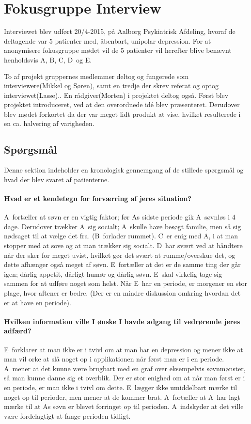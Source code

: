 \newcommand{\pa}{A}
\newcommand{\pb}{B}
\newcommand{\pc}{C}
\newcommand{\pd}{D}
\newcommand{\pe}{E}

\section{Fokusgruppe Interview}
Interviewet blev udført 20/4-2015, på Aalborg Psykiatrisk Afdeling, hvoraf de deltagende var 5 patienter med, åbenbart, unipolar depression.
For at anonymisere fokusgruppe mødet vil de 5 patienter vil herefter blive benævnt henholdsvis \pa, \pb, \pc, \pd~og \pe.

To af projekt gruppernes medlemmer deltog og fungerede som interviewere(Mikkel og Søren), samt en tredje der skrev referat og optog interviewet(Lasse).. En rådgiver(Morten) i projektet deltog også.
Først blev projektet introduceret, ved at den overordnede idé blev præsenteret.
Derudover blev mødet forkortet da der var meget lidt produkt at vise, hvilket resulterede i en ca. halvering af varigheden.

\subsection{Spørgsmål}
Denne sektion indeholder en kronologisk gennemgang af de stillede spørgsmål og hvad der blev svaret af patienterne.

\paragraph{Hvad er et kendetegn for forværring af jeres situation?}
\pa~fortæller at søvn er en vigtig faktor; før \pa s sidste periode gik \pa~søvnløs i 4 dage.
Derudover trækker \pa~sig socialt; \pa~skulle have besøgt familie, men så sig nødsaget til at vælge det fra.
(\pb~forlader rummet).
\pc~er enig med \pa, i at man stopper med at sove og at man trækker sig socialt.
\pd~har svært ved at håndtere når der sker for meget uvist, hvilket gør det svært at rumme/overskue det, og dette afhænger også meget af søvn.
\pe~fortæller at det er de samme ting der går igen; dårlig appetit, dårligt humør og dårlig søvn.
\pe~skal virkelig tage sig sammen for at udføre noget som helst.
Når \pe~har en periode, er morgener en stor plage, hvor aftener er bedre.
(Der er en mindre diskussion omkring hvordan det er at have en periode).

\paragraph{Hvilken information ville I ønske I havde adgang til vedrørende jeres adfærd?}
\pe~forklarer at man ikke er i tvivl om at man har en depression og mener ikke at man vil orke at slå noget op i applikationen når først man er i en periode.
\pa~mener at det kunne være brugbart med en graf over eksempelvis søvnmønster, så man kunne danne sig et overblik.
Der er stor enighed om at når man først er i en periode, er man ikke i tvivl om dette.
\pe~lægger ikke umiddelbart mærke til noget op til perioder, men mener at de kommer brat.
\pa~fortæller at \pa~har lagt mærke til at \pa s søvn er blevet forringet op til perioden.
\pa~indskyder at det ville være fordelagtigt at fange perioden tidligt.

